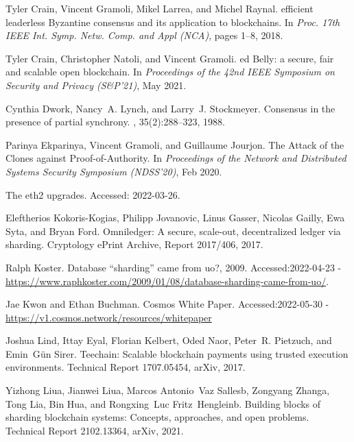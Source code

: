 \documentclass[11pt,dvipdfm]{article}
\begin{document}
\begin{thebibliography}{10}
Tyler Crain, Vincent Gramoli, Mikel Larrea, and Michel Raynal.
 efficient leaderless {B}yzantine consensus and its
  application to blockchains.
\newblock In {\em Proc. 17th {IEEE} Int. Symp. Netw. Comp. and Appl (NCA)},
  pages 1--8, 2018.

Tyler Crain, Christopher Natoli, and Vincent Gramoli.
ed {B}elly: a secure, fair and scalable open blockchain.
\newblock In {\em Proceedings of the 42nd IEEE Symposium on Security and
  Privacy (S\&P'21)}, May 2021.

Cynthia Dwork, Nancy~A. Lynch, and Larry~J. Stockmeyer.
\newblock Consensus in the presence of partial synchrony.
, 35(2):288--323, 1988.

Parinya Ekparinya, Vincent Gramoli, and Guillaume Jourjon.
\newblock The {A}ttack of the {C}lones against {P}roof-of-{A}uthority.
\newblock In {\em Proceedings of the Network and Distributed Systems Security
  Symposium (NDSS'20)}, Feb 2020.

The eth2 upgrades.
\newblock Accessed: 2022-03-26.

Eleftherios Kokoris-Kogias, Philipp Jovanovic, Linus Gasser, Nicolas Gailly,
  Ewa Syta, and Bryan Ford.
\newblock Omniledger: A secure, scale-out, decentralized ledger via sharding.
\newblock Cryptology ePrint Archive, Report 2017/406, 2017.

Ralph Koster.
\newblock Database “sharding” came from uo?, 2009.
\newblock Accessed:2022-04-23 -
  \url{https://www.raphkoster.com/2009/01/08/database-sharding-came-from-uo/}.
  
Jae Kwon and Ethan Buchman.
\newblock Cosmos White Paper.
\newblock Accessed:2022-05-30 - 
  \url{https://v1.cosmos.network/resources/whitepaper}

Joshua Lind, Ittay Eyal, Florian Kelbert, Oded Naor, Peter~R. Pietzuch, and
  Emin~G{\"{u}}n Sirer.
\newblock Teechain: Scalable blockchain payments using trusted execution
  environments.
\newblock Technical Report 1707.05454, arXiv, 2017.

Yizhong Liua, Jianwei Liua, Marcos Antonio~Vaz Sallesb, Zongyang Zhanga, Tong
  Lia, Bin Hua, and Rongxing~Luc Fritz~Hengleinb.
\newblock Building blocks of sharding blockchain systems: Concepts, approaches,
  and open problems.
\newblock Technical Report 2102.13364, arXiv, 2021.


\end{thebibliography}
\end{document}
